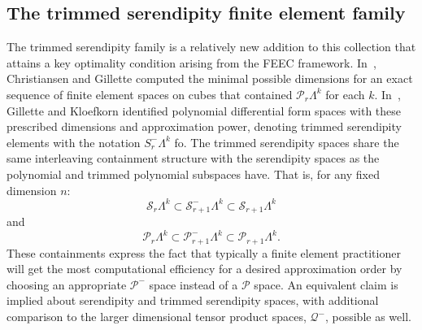 \documentclass[manuscript,screen]{acmart}
\newcommand{\calP}{\mathcal{P}}
\newcommand{\calQ}{\mathcal{Q}}
\newcommand{\calS}{\mathcal{S}}
\begin{document}
  \subsection{The trimmed serendipity finite element family}
    The trimmed serendipity family is a relatively new addition to this collection that attains a key optimality condition arising from the FEEC framework.
	In~\cite{christiansen2016constructions}, Christiansen and Gillette computed the minimal possible dimensions for an exact sequence of finite element spaces on cubes that contained $\calP_r\Lambda^k$ for each $k$.
	In~\cite{gillette2019trimmed}, Gillette and Kloefkorn identified polynomial differential form spaces with these prescribed dimensions and approximation power, denoting trimmed serendipity elements with the notation $S^-_r\Lambda^k$ fo.  
	The trimmed serendipity spaces share the same interleaving containment structure with the serendipity spaces as the polynomial and trimmed polynomial subspaces have.  That is, for any fixed dimension $n$:
\begin{equation*}
      \calS_r \Lambda^k \subset \calS^-_{r+1} \Lambda^k \subset \calS_{r+1} \Lambda^k
  \end{equation*}
 \noindent and   
   \begin{equation*}
      \calP_r \Lambda^k \subset \calP^-_{r+1} \Lambda^k \subset \calP_{r+1} \Lambda^k.
  \end{equation*}
	These containments express the fact that typically a finite element practitioner will get the most computational efficiency for a desired approximation order by choosing an appropriate $\calP^-$ space instead of a $\calP$ space.
	An equivalent claim is implied about serendipity and trimmed serendipity spaces, with additional comparison to the larger dimensional tensor product spaces, $\calQ^-$, possible as well.
	

        
\end{document}
